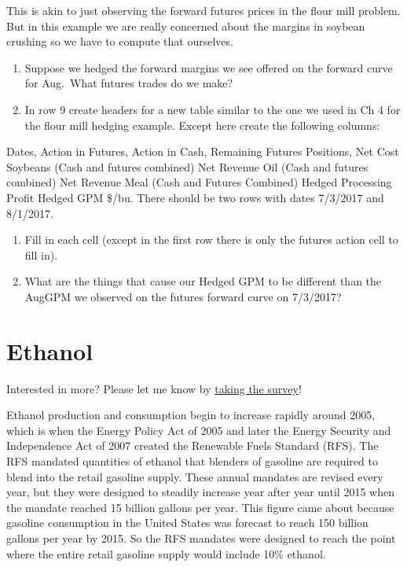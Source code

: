 \documentclass[
  letterpaper,
  DIV=11,
  numbers=noendperiod]{scrreprt}
\begin{document}
This is akin to just observing the forward futures prices in the flour
mill problem. But in this example we are really concerned about the
margins in soybean crushing so we have to compute that ourselves.

\begin{enumerate}
\def\labelenumi{\arabic{enumi}.}
\setcounter{enumi}{1}
\item
  Suppose we hedged the forward margins we see offered on the forward
  curve for Aug.~What futures trades do we make?
\item
  In row 9 create headers for a new table similar to the one we used in
  Ch 4 for the flour mill hedging example. Except here create the
  following columns:
\end{enumerate}

Dates, Action in Futures, Action in Cash, Remaining Futures Positions,
Net Cost Soybeans (Cash and futures combined) Net Revenue Oil (Cash and
futures combined) Net Revenue Meal (Cash and Futures Combined) Hedged
Processing Profit Hedged GPM \$/bu. There should be two rows with dates
7/3/2017 and 8/1/2017.

\begin{enumerate}
\def\labelenumi{\arabic{enumi}.}
\setcounter{enumi}{3}
\item
  Fill in each cell (except in the first row there is only the futures
  action cell to fill in).
\item
  What are the things that cause our Hedged GPM to be different than the
  AugGPM we observed on the futures forward curve on 7/3/2017?
\end{enumerate}


\chapter{Ethanol}\label{ethanol}

{Interested in more? Please let me know by}
\href{https://forms.gle/Q3VByCQZHjfQSy9D7}{taking the survey}!

Ethanol production and consumption begin to increase rapidly around
2005, which is when the Energy Policy Act of 2005 and later the Energy
Security and Independence Act of 2007 created the Renewable Fuels
Standard (RFS). The RFS mandated quantities of ethanol that blenders of
gasoline are required to blend into the retail gasoline supply. These
annual mandates are revised every year, but they were designed to
steadily increase year after year until 2015 when the mandate reached 15
billion gallons per year. This figure came about because gasoline
consumption in the United States was forecast to reach 150 billion
gallons per year by 2015. So the RFS mandates were designed to reach the
point where the entire retail gasoline supply would include 10\%
ethanol.
\end{document}
